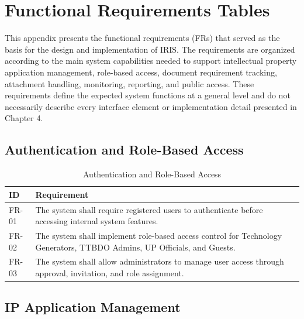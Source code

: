 \appendix

\chapter{Functional Requirements Tables}
\label{sec:appendixa}

This appendix presents the functional requirements (FRs) that served as the basis for the design and implementation of IRIS. The requirements are organized according to the main system capabilities needed to support intellectual property application management, role-based access, document requirement tracking, attachment handling, monitoring, reporting, and public access. These requirements define the expected system functions at a general level and do not necessarily describe every interface element or implementation detail presented in Chapter 4.

\section{Authentication and Role-Based Access}

\begin{table}[H]
\centering
\small
\caption{Authentication and Role-Based Access}
\label{tab:fr_auth_roles}
\begin{tabular}{|p{2.2cm}|p{12cm}|}
\hline
\textbf{ID} & \textbf{Requirement} \\
\hline
FR-01 & The system shall require registered users to authenticate before accessing internal system features. \\
\hline
FR-02 & The system shall implement role-based access control for Technology Generators, TTBDO Admins, UP Officials, and Guests. \\
\hline
FR-03 & The system shall allow administrators to manage user access through approval, invitation, and role assignment. \\
\hline
\end{tabular}
\end{table}

\section{IP Application Management}

